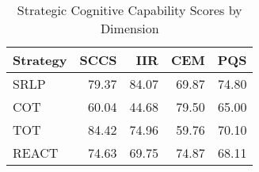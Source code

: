 \begin{table}[htbp]
\centering
\caption{Strategic Cognitive Capability Scores by Dimension}
\label{tab:sccs_by_dimension}
\begin{tabular}{lrrrr}
\toprule
Strategy & SCCS & IIR & CEM & PQS \\
\midrule
SRLP & 79.37 & 84.07 & 69.87 & 74.80 \\
COT & 60.04 & 44.68 & 79.50 & 65.00 \\
TOT & 84.42 & 74.96 & 59.76 & 70.10 \\
REACT & 74.63 & 69.75 & 74.87 & 68.11 \\
\bottomrule
\end{tabular}
\end{table}